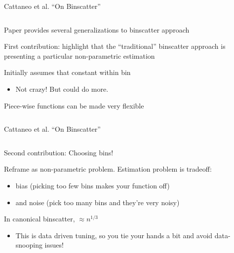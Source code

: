\documentclass[notes,11pt, aspectratio=169]{beamer}
\newenvironment{wideitemize}{\itemize\addtolength{\itemsep}{10pt}}{\enditemize}
\begin{document}
\begin{frame}{Cattaneo et al. ``On Binscatter''}
  \begin{columns}[T] %
    \begin{column}{.5\textwidth}
      \begin{wideitemize}
      \item Paper provides several generalizations to binscatter approach
      \item First contribution: highlight that the ``traditional''
        binscatter approach is presenting a particular non-parametric
        estimation
      \item Initially assumes that constant within bin
        \begin{itemize}
        \item Not crazy! But could do more. 
        \end{itemize}
      \item Piece-wise functions can be made very flexible
  \end{wideitemize}
  \end{column}%
  \hfill%
  \begin{column}{.5\textwidth}
  \end{column}
\end{columns}
  
\end{frame}

\begin{frame}{Cattaneo et al. ``On Binscatter''}
  \begin{columns}[T] %
    \begin{column}{.7\textwidth}
      \begin{wideitemize}
      \item Second contribution: Choosing bins!
      \item Reframe as non-parametric problem. Estimation problem is tradeoff:
        \begin{itemize}
        \item  bias (picking too few bins makes your function off)
        \item and noise (pick too many bins and they're very noisy)
        \end{itemize}
      \item In canonical binscatter, $\approx n^{1/3}$
        \begin{itemize}
        \item This is data driven tuning, so you tie your hands a bit and
          avoid data-snooping issues!
        \end{itemize}
  \end{wideitemize}
  \end{column}%
  \hfill%
  \begin{column}{.5\textwidth}
  \end{column}
\end{columns}
\end{frame}
\end{document}
